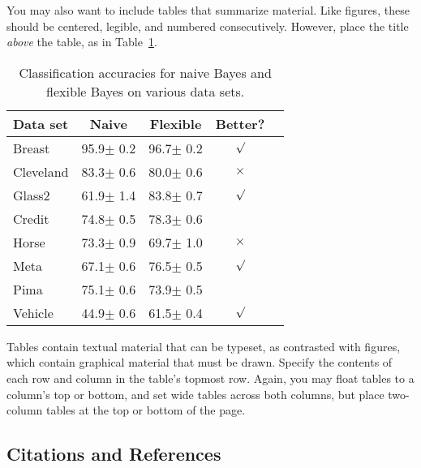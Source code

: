 \documentclass{article}
\begin{document}
You may also want to include tables that summarize material. Like 
figures, these should be centered, legible, and numbered consecutively. 
However, place the title {\it above\/} the table, as in 
Table~\ref{sample-table}.

\begin{table}[t]
\caption{Classification accuracies for naive Bayes and flexible 
Bayes on various data sets.}
\label{sample-table}
\vskip 0.15in
\begin{center}
\begin{small}
\begin{sc}
\begin{tabular}{lcccr}
\hline
\abovespace\belowspace
Data set & Naive & Flexible & Better? \\
\hline
\abovespace
Breast    & 95.9$\pm$ 0.2& 96.7$\pm$ 0.2& $\surd$ \\
Cleveland & 83.3$\pm$ 0.6& 80.0$\pm$ 0.6& $\times$\\
Glass2    & 61.9$\pm$ 1.4& 83.8$\pm$ 0.7& $\surd$ \\
Credit    & 74.8$\pm$ 0.5& 78.3$\pm$ 0.6&         \\
Horse     & 73.3$\pm$ 0.9& 69.7$\pm$ 1.0& $\times$\\
Meta      & 67.1$\pm$ 0.6& 76.5$\pm$ 0.5& $\surd$ \\
Pima      & 75.1$\pm$ 0.6& 73.9$\pm$ 0.5&         \\
\belowspace
Vehicle   & 44.9$\pm$ 0.6& 61.5$\pm$ 0.4& $\surd$ \\
\hline
\end{tabular}
\end{sc}
\end{small}
\end{center}
\vskip -0.1in
\end{table}

Tables contain textual material that can be typeset, as contrasted 
with figures, which contain graphical material that must be drawn. 
Specify the contents of each row and column in the table's topmost
row. Again, you may float tables to a column's top or bottom, and set
wide tables across both columns, but place two-column tables at the
top or bottom of the page.
 
\subsection{Citations and References} 
\end{document}
